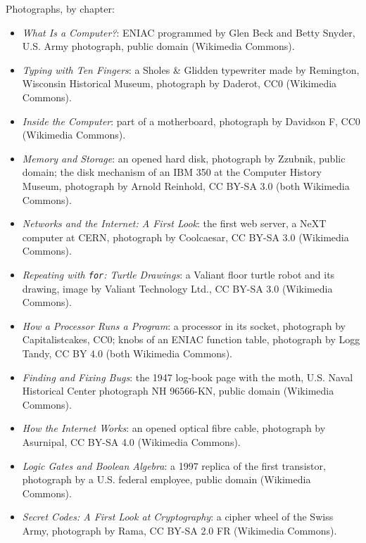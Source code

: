 \bigskip
\noindent Photographs, by chapter:
\begin{itemize}\small
  \item \textit{What Is a Computer?}: ENIAC programmed by Glen Beck and Betty
    Snyder, U.S. Army photograph, public domain (Wikimedia Commons).
  \item \textit{Typing with Ten Fingers}: a Sholes \& Glidden typewriter made
    by Remington, Wisconsin Historical Museum, photograph by Daderot, CC0
    (Wikimedia Commons).
  \item \textit{Inside the Computer}: part of a motherboard, photograph by
    Davidson F, CC0 (Wikimedia Commons).
  \item \textit{Memory and Storage}: an opened hard disk, photograph by
    Zzubnik, public domain; the disk mechanism of an IBM 350 at the Computer
    History Museum, photograph by Arnold Reinhold, CC BY-SA 3.0
    (both Wikimedia Commons).
  \item \textit{Networks and the Internet: A First Look}: the first web server,
    a NeXT computer at CERN, photograph by Coolcaesar, CC BY-SA 3.0
    (Wikimedia Commons).
  \item \textit{Repeating with \texttt{for}: Turtle Drawings}: a Valiant floor
    turtle robot and its drawing, image by Valiant Technology Ltd., CC BY-SA
    3.0 (Wikimedia Commons).
  \item \textit{How a Processor Runs a Program}: a processor in its socket,
    photograph by Capitalistcakes, CC0; knobs of an ENIAC function table,
    photograph by Logg Tandy, CC BY 4.0 (both Wikimedia Commons).
  \item \textit{Finding and Fixing Bugs}: the 1947 log-book page with the
    moth, U.S. Naval Historical Center photograph NH 96566-KN, public domain
    (Wikimedia Commons).
  \item \textit{How the Internet Works}: an opened optical fibre cable,
    photograph by Asurnipal, CC BY-SA 4.0 (Wikimedia Commons).
  \item \textit{Logic Gates and Boolean Algebra}: a 1997 replica of the first
    transistor, photograph by a U.S. federal employee, public domain
    (Wikimedia Commons).
  \item \textit{Secret Codes: A First Look at Cryptography}: a cipher wheel of
    the Swiss Army, photograph by Rama, CC BY-SA 2.0 FR (Wikimedia Commons).
\end{itemize}
